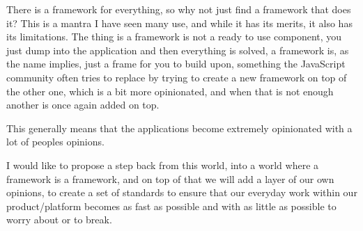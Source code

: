 There is a framework for everything, so why not just find a framework that does it? This is a mantra I have seen many use, and while it has its merits, it also has its limitations. The thing is a framework is not a ready to use component, you just dump into the application and then everything is solved, a framework is, as the name implies, just a frame for you to build upon, something the JavaScript community often tries to replace by trying to create a new framework on top of the other one, which is a bit more opinionated, and when that is not enough another is once again added on top.

This generally means that the applications become extremely opinionated with a lot of peoples opinions.

I would like to propose a step back from this world, into a world where a framework is a framework, and on top of that we will add a layer of our own opinions, to create a set of standards to ensure that our everyday work within our product/platform becomes as fast as possible and with as little as possible to worry about or to break.